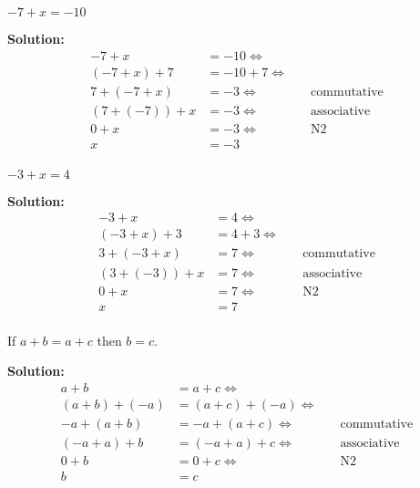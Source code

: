 \documentclass[6pt]{article}
\begin{document}
\begin{tcolorbox}[title=Problem 20, breakable]
$-7 + x = -10$
\end{tcolorbox}

\textbf{Solution:}
\begin{align*}
-7 + x &= -10 \Leftrightarrow & \quad \text{} \\
(-7 + x) + 7 &= -10 + 7 \Leftrightarrow & \quad \text{} \\ 
7 + (-7 + x) &= -3 \Leftrightarrow & \quad \text{commutative}  \\ 
(7 + (-7)) + x &= -3 \Leftrightarrow & \quad \text{associative}  \\ 
0 + x &= -3 \Leftrightarrow & \quad \text{N2}  \\
x &= -3 & \quad \text{}  \\
\end{align*}


\begin{tcolorbox}[title=Problem 21, breakable]
$-3 + x = 4$
\end{tcolorbox}

\textbf{Solution:}
\begin{align*}
-3 + x &= 4 \Leftrightarrow & \quad \text{} \\
(-3 + x) + 3 &= 4 + 3 \Leftrightarrow & \quad \text{} \\
3 + (-3 + x) &= 7 \Leftrightarrow & \quad \text{commutative}  \\ 
(3 + (-3)) + x &= 7 \Leftrightarrow & \quad \text{associative}  \\ 
0 + x &= 7  \Leftrightarrow & \quad \text{N2}  \\
x &= 7 & \quad \text{}  \\
\end{align*}

\begin{tcolorbox}[title=22 Prove the cancellation law for addition, breakable]
If $a + b = a + c$ then $b = c$.
\end{tcolorbox}

\textbf{Solution:}
\begin{align*}
a + b &= a + c \Leftrightarrow & \quad \text{} \\
(a + b) + (-a) &= (a + c) + (-a) \Leftrightarrow & \quad \text{} \\
-a + (a + b) &= -a + (a + c) \Leftrightarrow & \quad \text{commutative}  \\ 
(-a + a) + b &= (-a + a) + c \Leftrightarrow & \quad \text{associative}  \\ 
0 + b &= 0 + c \Leftrightarrow & \quad \text{N2}  \\
b &= c & \quad \text{}  \\
\end{align*}
\end{document}
